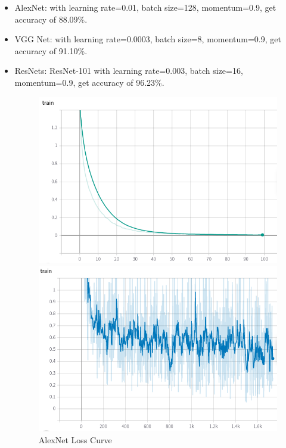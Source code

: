 \documentclass{article} %
\begin{document}
\begin{itemize}
\item AlexNet: with learning rate=0.01, batch size=128, momentum=0.9, get accuracy of 88.09\%.

\item VGG Net: with learning rate=0.0003, batch size=8, momentum=0.9, get accuracy of 91.10\%.

\item ResNets: ResNet-101 with learning rate=0.003, batch size=16, momentum=0.9, get accuracy of 96.23\%.


\begin{figure}[htbp]
\centering
{
\begin{minipage}[t]{0.45\textwidth}
\centering
\includegraphics[scale=0.3]{3.png}
\caption{AlexNet Loss Curve}
\end{minipage}
}
{
\begin{minipage}[t]{0.45\linewidth}
\centering
\includegraphics[scale=0.3]{4.png}

\end{minipage}}
\end{figure}
\end{itemize}
\end{document}
